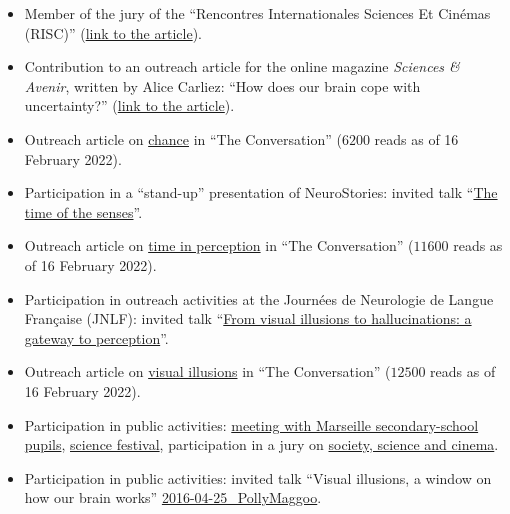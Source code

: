\documentclass[10pt,english,a4paper,oneside]{article}%
\newcommand{\years}[1]{\marginpar{\textit{\scriptsize #1}}}
\begin{document}
\begin{itemize}
    \item Member of the jury of the ``Rencontres Internationales Sciences Et Cinémas (RISC)'' (\href{https://laurentperrinet.github.io/post/2023-12-16-risc/}{link to the article}).

    \item Contribution to an outreach article for the online magazine \textit{Sciences \& Avenir}, written by Alice Carliez: ``How does our brain cope with uncertainty?'' (\href{https://laurentperrinet.github.io/post/2023-07-26-epsiloon/}{link to the article}).

	\item Outreach article on \href{https://laurentperrinet.github.io/publication/perrinet-21-hasard/}{chance} in ``The Conversation'' ($6200$ reads as of 16 February 2022). \years{2022}

	\item Participation in a ``stand-up'' presentation of NeuroStories: invited talk ``\href{https://laurentperrinet.github.io/post/2019-10-07_neurostories/}{The time of the senses}''. \years{2019}

	\item Outreach article on \href{https://laurentperrinet.github.io/publication/perrinet-19-temps/}{time in perception} in ``The Conversation'' ($11600$ reads as of 16 February 2022).

	\item Participation in outreach activities at the Journées de Neurologie de Langue Française (JNLF): invited talk ``\href{https://laurentperrinet.github.io/talk/2019-04-18-jnlf/}{From visual illusions to hallucinations: a gateway to perception}''.

	\item Outreach article on \href{https://theconversation.com/illusions-et-hallucinations-visuelles-une-porte-sur-la-perception-117389}{visual illusions} in ``The Conversation'' ($12500$ reads as of 16 February 2022). \years{2018}

	\item Participation in public activities: \href{https://laurentperrinet.github.io/talk/2019-01-10-polly-maggoo/}{meeting with Marseille secondary-school pupils}, \href{https://laurentperrinet.github.io/talk/2018-10-10-polly-maggoo/}{science festival}, participation in a jury on \href{https://laurentperrinet.github.io/talk/2017-11-17-festival-interferences/}{society, science and cinema}.


	\item Participation in public activities: invited talk\years{2016} ``Visual illusions, a window on how our brain works'' \url{2016-04-25_PollyMaggoo}. \years{2016}


\end{itemize}
\end{document}
